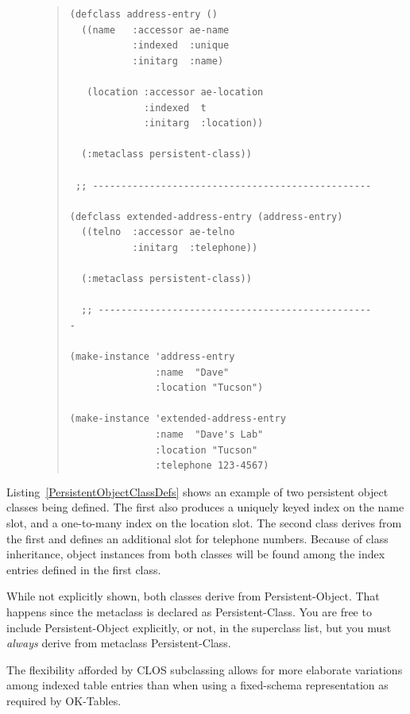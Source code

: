 \documentclass[article,oneside]{memoir}
\begin{document}
\begin{figure}[!htbp]
\begin{quote}
\begin{lstlisting}
(defclass address-entry ()
  ((name   :accessor ae-name
           :indexed  :unique
           :initarg  :name)

   (location :accessor ae-location
             :indexed  t
             :initarg  :location))
  
  (:metaclass persistent-class))

 ;; -------------------------------------------------

(defclass extended-address-entry (address-entry)
  ((telno  :accessor ae-telno
           :initarg  :telephone))

  (:metaclass persistent-class))
  
  ;; -------------------------------------------------

(make-instance 'address-entry
               :name  "Dave"
               :location "Tucson")

(make-instance 'extended-address-entry
               :name  "Dave's Lab"
               :location "Tucson"
               :telephone 123-4567)

\end{lstlisting}
\end{quote}
\end{figure}

Listing~\ref{PersistentObjectClassDefs} shows an example of two persistent object classes being defined. The first also produces a uniquely keyed index on the name slot, and a one-to-many index on the location slot. The second class derives from the first and defines an additional slot for telephone numbers. Because of class inheritance, object instances from both classes will be found among the index entries defined in the first class.

While not explicitly shown, both classes derive from {\ttfamily Persistent-Object}. That happens since the metaclass is declared as {\ttfamily Persistent-Class}. You are free to include {\ttfamily Persistent-Object} explicitly, or not, in the superclass list, but you must \textit{always} derive from metaclass {\ttfamily Persistent-Class}.

The flexibility afforded by CLOS subclassing allows for more elaborate variations among indexed table entries than when using a fixed-schema representation as required by OK-Tables.
\end{document}
